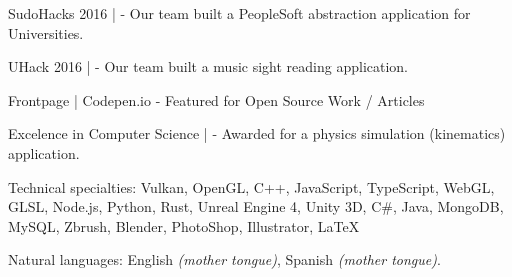 \documentclass[10pt,a4paper]{article}
\begin{document}

\inlineheadsection %
{SudoHacks 2016 | }
{ - Our team built a PeopleSoft abstraction application for Universities.}

\inlineheadsection %
{UHack 2016 | }
{ - Our team built a music sight reading application.}

\inlineheadsection %
{Frontpage  | Codepen.io}
{ - Featured for Open Source Work / Articles}

\inlineheadsection %
{Excelence in Computer Science | }
{ - Awarded for a physics simulation (kinematics) application.}


\spacedhrule{1.6em}{-0.4em} %



\inlineheadsection %
{Technical specialties:}
{Vulkan, OpenGL, C++, JavaScript, TypeScript, WebGL, GLSL, Node.js, Python, Rust, Unreal Engine 4, Unity 3D, C\#, Java, MongoDB, MySQL, Zbrush, Blender, PhotoShop, Illustrator, LaTeX}


\inlineheadsection %
{Natural languages:}
{English \textit{(mother tongue)}, Spanish \textit{(mother tongue)}.}


\spacedhrule{1.6em}{-0.4em} %
\end{document}
